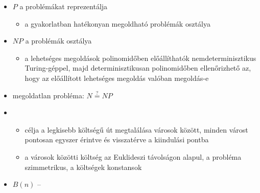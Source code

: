 \documentclass[main.tex]{subfiles}
\begin{document}
  \begin{itemize}
    \item $P$ a  problémákat reprezentálja
    \begin{itemize}
      \item a gyakorlatban hatékonyan megoldható problémák osztálya
    \end{itemize}

    \item $NP$ a  problémák osztálya
    \begin{itemize}
      \item a lehetséges megoldások polinomidőben előállíthatók
      nemdeterminisztikus Turing-géppel,
      majd determinisztikusan polinomidőben ellenőrizhető az,
      hogy az előállított lehetséges megoldás valóban megoldás-e
    \end{itemize}

    \item megoldatlan probléma: $N \overset{?}{=} NP$
    
    \item {}
    \begin{itemize}
      \item célja a legkisebb költségű út megtalálása városok között,
      minden várost pontosan egyszer érintve és visszatérve a
      kiindulási pontba

      \item a városok közötti költség az Euklideszi távolságon alapul,
      a probléma szimmetrikus, a költségek konstansok
    \end{itemize}

    \item $B(n)$ – 
  \end{itemize}
\end{document}
